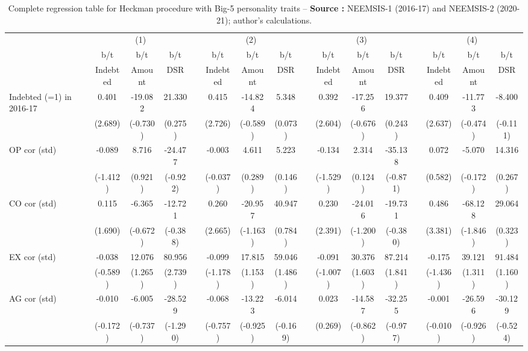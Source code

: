 {\tiny\tabcolsep=0pt
    \begin{longtable}{@{\extracolsep{\fill}}lccccccccccccccc}
	\caption{Complete regression table for Heckman procedure with Big-5 personality traits --  \textbf{Source :} NEEMSIS-1 (2016-17) and NEEMSIS-2 (2020-21); author's calculations.} \\
    \toprule
      & \multicolumn{3}{c}{(1)} &   & \multicolumn{3}{c}{(2)} &   & \multicolumn{3}{c}{(3)} &   & \multicolumn{3}{c}{(4)} \\
\cmidrule{2-4}\cmidrule{6-8}\cmidrule{10-12}\cmidrule{14-16}      & b/t & b/t & b/t &   & b/t & b/t & b/t &   & b/t & b/t & b/t &   & b/t & b/t & b/t \\
      & Indebted & Amount & DSR &   & Indebted & Amount & DSR &   & Indebted & Amount & DSR &   & Indebted & Amount & DSR \\
    \midrule
    Indebted (=1) in 2016-17 & 0.401 & -19.082 & 21.330 &   & 0.415 & -14.824 & 5.348 &   & 0.392 & -17.256 & 19.377 &   & 0.409 & -11.773 & -8.400 \\
      & (2.689) & (-0.730) & (0.275) &   & (2.726) & (-0.589) & (0.073) &   & (2.604) & (-0.676) & (0.243) &   & (2.637) & (-0.474) & (-0.111) \\
    OP cor (std) & -0.089 & 8.716 & -24.477 &   & -0.003 & 4.611 & 5.223 &   & -0.134 & 2.314 & -35.138 &   & 0.072 & -5.070 & 14.316 \\
      & (-1.412) & (0.921) & (-0.922) &   & (-0.037) & (0.289) & (0.146) &   & (-1.529) & (0.124) & (-0.871) &   & (0.582) & (-0.172) & (0.267) \\
    CO cor (std) & 0.115 & -6.365 & -12.721 &   & 0.260 & -20.957 & 40.947 &   & 0.230 & -24.016 & -19.731 &   & 0.486 & -68.128 & 29.064 \\
      & (1.690) & (-0.672) & (-0.388) &   & (2.665) & (-1.163) & (0.784) &   & (2.391) & (-1.200) & (-0.380) &   & (3.381) & (-1.846) & (0.323) \\
    EX cor (std) & -0.038 & 12.076 & 80.956 &   & -0.099 & 17.815 & 59.046 &   & -0.091 & 30.376 & 87.214 &   & -0.175 & 39.121 & 91.484 \\
      & (-0.589) & (1.265) & (2.739) &   & (-1.178) & (1.153) & (1.486) &   & (-1.007) & (1.603) & (1.841) &   & (-1.436) & (1.311) & (1.160) \\
    AG cor (std) & -0.010 & -6.005 & -28.529 &   & -0.068 & -13.223 & -6.014 &   & 0.023 & -14.587 & -32.255 &   & -0.001 & -26.596 & -30.129 \\
      & (-0.172) & (-0.737) & (-1.290) &   & (-0.757) & (-0.925) & (-0.169) &   & (0.269) & (-0.862) & (-0.977) &   & (-0.010) & (-0.926) & (-0.524) \\

\end{longtable}}
